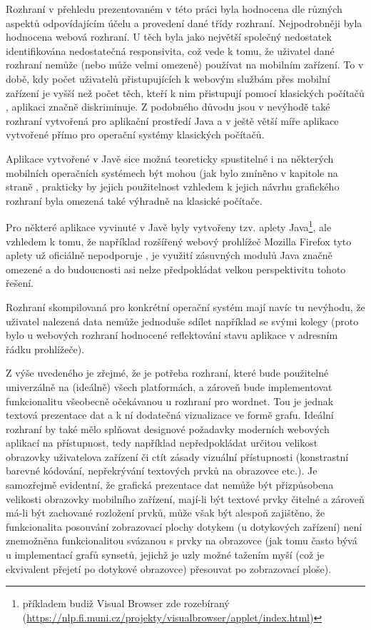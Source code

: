 \documentclass[a4paper, 11pt, oneside]{book}
\newcommand{\itNameRef}[1]{\textit{\nameref{#1}}}
\begin{document}
			Rozhraní v přehledu prezentovaném v této práci byla hodnocena dle různých aspektů odpovídajícím účelu a provedení dané třídy rozhraní. Nejpodrobněji byla hodnocena webová rozhraní. U těch byla jako největší společný nedostatek identifikována nedostatečná responsivita, což vede k tomu, že uživatel dané rozhraní nemůže (nebo může velmi omezeně) používat na mobilním zařízení. To v době, kdy počet uživatelů přistupujících k webovým službám přes mobilní zařízení je vyšší než počet těch, kteří k nim přistupují pomocí klasických počítačů \parencite{Heisler2016}, aplikaci značně diskriminuje. Z podobného důvodu jsou v nevýhodě také rozhraní vytvořená pro aplikační prostředí Java a v ještě větší míře aplikace vytvořené přímo pro operační systémy klasických počítačů. 

			Aplikace vytvořené v Javě sice možná teoreticky spustitelné i na některých mobilních operačních systémech být mohou (jak bylo zmíněno v kapitole \itNameRef{cha:structhodnoc} na straně \pageref{cha:structhodnoc}, prakticky by jejich použitelnost vzhledem k jejich návrhu grafického rozhraní byla omezená také výhradně na klasické počítače. 

			Pro některé aplikace vyvinuté v Javě byly vytvořeny tzv. aplety Java\footnote{příkladem budiž Visual Browser zde rozebíraný (\url{https://nlp.fi.muni.cz/projekty/visualbrowser/applet/index.html})}, ale vzhledem k tomu, že například rozšířený webový prohlížeč Mozilla Firefox tyto aplety už oficiálně nepodporuje \parencite{MozzilaFoundation2017}, je využití zásuvných modulů Java značně omezené a do budoucnosti asi nelze předpokládat velkou perspektivitu tohoto řešení.

			Rozhraní skompilovaná pro konkrétní operační systém mají navíc tu nevýhodu, že uživatel nalezená data nemůže jednoduše sdílet například se svými kolegy (proto bylo u webových rozhraní hodnocené reflektování stavu aplikace v adresním řádku prohlížeče). 

			Z výše uvedeného je zřejmé, že je potřeba rozhraní, které bude použitelné univerzálně na (ideálně) všech platformách, a zároveň bude implementovat funkcionalitu všeobecně očekávanou u rozhraní pro wordnet. Tou je jednak textová prezentace dat a k ní dodatečná vizualizace ve formě grafu. Ideální rozhraní by také mělo splňovat designové požadavky moderních webových aplikací na přístupnost, tedy například nepředpokládat určitou velikost obrazovky uživatelova zařízení či ctít zásady vizuální přístupnosti (konstrastní barevné kódování, nepřekrývání textových prvků na obrazovce etc.). Je samozřejmě evidentní, že grafická prezentace dat nemůže být přizpůsobena velikosti obrazovky mobilního zařízení, mají-li být textové prvky čitelné a zároveň má-li být zachované rozložení prvků, může však být alespoň zajištěno, že funkcionalita posouvání zobrazovací plochy dotykem (u dotykových zařízení) není znemožněna funkcionalitou svázanou s prvky na obrazovce (jak tomu často bývá u implementací grafů synsetů, jejichž je uzly možné tažením myší (což je ekvivalent přejetí po dotykové obrazovce) přesouvat po zobrazovací ploše). 
\end{document}
